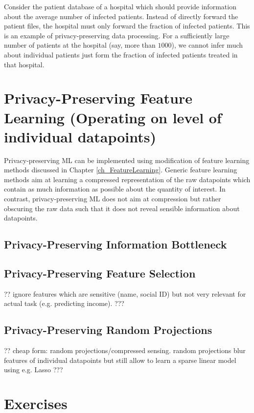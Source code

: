 \documentclass[12pt]{report}
\begin{document}
Consider the patient database of a hospital which should provide information 
about the average number of infected patients. Instead of directly forward 
the patient files, the hospital must only forward the fraction of infected patients. 
This is an example of privacy-preserving data processing. For a sufficiently large 
number of patients at the hospital (say, more than $1000$), we cannot infer much 
about individual patients just form the fraction of infected patients treated in that 
hospital. 

\section{Privacy-Preserving Feature Learning (Operating on level of individual datapoints)}

Privacy-preserving ML can be implemented using modification of feature learning 
methods discussed in Chapter \ref{ch_FeatureLearning}. Generic feature learning 
methods aim at learning a compressed representation of the raw datapoints which 
contain as much information as possible about the quantity of interest. In contrast, 
privacy-preserving ML does not aim at compression but rather obscuring the raw 
data such that it does not reveal sensible information about datapoints. 


\subsection{Privacy-Preserving Information Bottleneck} %


\subsection{Privacy-Preserving Feature Selection} 
?? ignore features which are sensitive (name, social ID) 
but not very relevant for actual task (e.g. predicting income).    ???

\subsection{Privacy-Preserving Random Projections} 
?? cheap form: random projections/compressed sensing. 
random projections blur features of individual datapoints 
but still allow to learn a sparse linear model using e.g. Lasso ???


\section{Exercises} 
\end{document}
